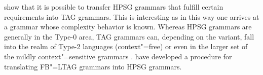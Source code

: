 \citet*{KKNV95a} show that it is possible to transfer HPSG grammars that fulfill certain requirements into TAG grammars. This is interesting
as in this way one arrives at a grammar whose complexity behavior is known. Whereas HPSG grammars are generally
in the Type-0 area, TAG grammars can, depending on the variant, fall into the realm of Type-2 languages (context"=free) or even in the
larger set of the mildly context"=sensitive grammars \citep{Joshi85a-u}. \citet*{YMTT2001a} have developed a procedure for translating FB"=LTAG grammars into
HPSG grammars.


\bigskip
{}



